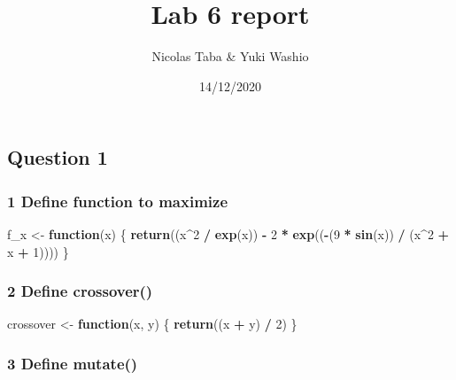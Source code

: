 \documentclass[
]{article}
\title{Lab 6 report}
\author{Nicolas Taba \& Yuki Washio}
\date{14/12/2020}
\newenvironment{Shaded}{\begin{snugshade}}{\end{snugshade}}
\newcommand{\ControlFlowTok}[1]{\textcolor[rgb]{0.13,0.29,0.53}{\textbf{#1}}}
\newcommand{\DecValTok}[1]{\textcolor[rgb]{0.00,0.00,0.81}{#1}}
\newcommand{\KeywordTok}[1]{\textcolor[rgb]{0.13,0.29,0.53}{\textbf{#1}}}
\newcommand{\NormalTok}[1]{#1}
\newcommand{\OperatorTok}[1]{\textcolor[rgb]{0.81,0.36,0.00}{\textbf{#1}}}
\newcommand{\StringTok}[1]{\textcolor[rgb]{0.31,0.60,0.02}{#1}}
\begin{document}
\maketitle

\hypertarget{question-1}{%
\subsection{Question 1}\label{question-1}}

\hypertarget{define-function-to-maximize}{%
\subsubsection{1 Define function to
maximize}\label{define-function-to-maximize}}

\begin{Shaded}
\begin{Highlighting}[]
\NormalTok{f_x <-}\StringTok{ }\ControlFlowTok{function}\NormalTok{(x) \{}
  \KeywordTok{return}\NormalTok{((x}\OperatorTok{^}\DecValTok{2} \OperatorTok{/}\StringTok{ }\KeywordTok{exp}\NormalTok{(x)) }\OperatorTok{-}\StringTok{ }\DecValTok{2} \OperatorTok{*}\StringTok{ }\KeywordTok{exp}\NormalTok{((}\OperatorTok{-}\NormalTok{(}\DecValTok{9} \OperatorTok{*}\StringTok{ }\KeywordTok{sin}\NormalTok{(x)) }\OperatorTok{/}\StringTok{ }\NormalTok{(x}\OperatorTok{^}\DecValTok{2} \OperatorTok{+}\StringTok{ }\NormalTok{x }\OperatorTok{+}\StringTok{ }\DecValTok{1}\NormalTok{))))}
\NormalTok{\}}
\end{Highlighting}
\end{Shaded}

\hypertarget{define-crossover}{%
\subsubsection{2 Define crossover()}\label{define-crossover}}

\begin{Shaded}
\begin{Highlighting}[]
\NormalTok{crossover <-}\StringTok{ }\ControlFlowTok{function}\NormalTok{(x, y) \{}
  \KeywordTok{return}\NormalTok{((x }\OperatorTok{+}\StringTok{ }\NormalTok{y) }\OperatorTok{/}\StringTok{ }\DecValTok{2}\NormalTok{)}
\NormalTok{\}}
\end{Highlighting}
\end{Shaded}

\hypertarget{define-mutate}{%
\subsubsection{3 Define mutate()}\label{define-mutate}}
\end{document}
